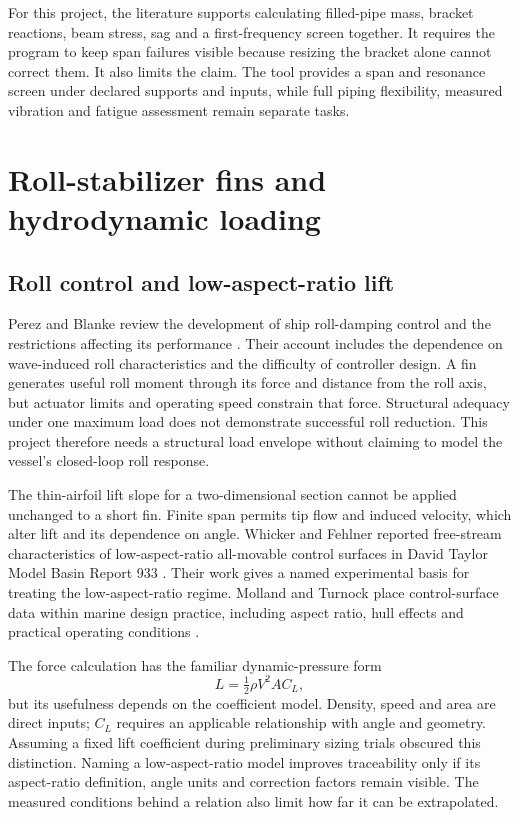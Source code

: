 For this project, the literature supports calculating filled-pipe mass, bracket reactions, beam stress, sag and a first-frequency screen together. It requires the program to keep span failures visible because resizing the bracket alone cannot correct them. It also limits the claim. The tool provides a span and resonance screen under declared supports and inputs, while full piping flexibility, measured vibration and fatigue assessment remain separate tasks.

\section{Roll-stabilizer fins and hydrodynamic loading}
\label{sec:lit-stabilizer}

\subsection{Roll control and low-aspect-ratio lift}
\label{sec:lit-fin-lift}

Perez and Blanke review the development of ship roll-damping control and the restrictions affecting its performance \cite{perez2012}. Their account includes the dependence on wave-induced roll characteristics and the difficulty of controller design. A fin generates useful roll moment through its force and distance from the roll axis, but actuator limits and operating speed constrain that force. Structural adequacy under one maximum load does not demonstrate successful roll reduction. This project therefore needs a structural load envelope without claiming to model the vessel's closed-loop roll response.

The thin-airfoil lift slope for a two-dimensional section cannot be applied unchanged to a short fin. Finite span permits tip flow and induced velocity, which alter lift and its dependence on angle. Whicker and Fehlner reported free-stream characteristics of low-aspect-ratio all-movable control surfaces in David Taylor Model Basin Report 933 \cite{whicker1958}. Their work gives a named experimental basis for treating the low-aspect-ratio regime. Molland and Turnock place control-surface data within marine design practice, including aspect ratio, hull effects and practical operating conditions \cite{molland2007}.

The force calculation has the familiar dynamic-pressure form
\begin{equation}
L=\tfrac{1}{2}\rho V^2 A C_L,
\label{eq:lit-foil-lift}
\end{equation}
but its usefulness depends on the coefficient model. Density, speed and area are direct inputs; $C_L$ requires an applicable relationship with angle and geometry. Assuming a fixed lift coefficient during preliminary sizing trials obscured this distinction. Naming a low-aspect-ratio model improves traceability only if its aspect-ratio definition, angle units and correction factors remain visible. The measured conditions behind a relation also limit how far it can be extrapolated.

